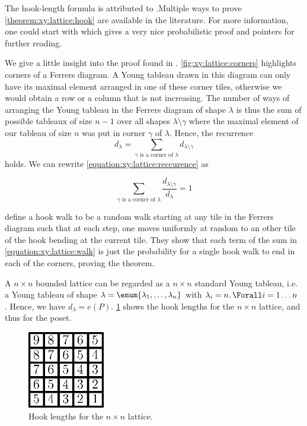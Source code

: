 The hook-length formula is attributed to \citet*{frame:1954}.Multiple ways to
prove \ref{theorem:xy:lattice:hook} are available in the literature. For more
information, one could start with \citet*{greene:1979} which gives a very nice
probabilistic proof and pointers for further reading.

We give a little insight into the proof found in \citet*{greene:1979}.
\ref{fig:xy:lattice:corners} highlights corners of a Ferrers diagram. A Young
tableau drawn in this diagram can only have its maximal element arranged in
one of these corner tiles, otherwise we would obtain a row or a column that is
not increasing. The number of ways of arranging the Young tableau in the
Ferrers diagram of shape \(\lambda\) is thus the sum of possible tableaux of
size \(n-1\) over all shapes \(\lambda \setminus \gamma\) where the maximal
element of our tableau of size \(n\) was put in corner \(\gamma\) of
\(\lambda\). Hence, the recurrence
\begin{equation}\label{equation:xy:lattice:reccurence}
d_{\lambda} = \sum_{\gamma \text{ is a corner of } \lambda} d_{\lambda
\setminus \gamma}
\end{equation}
holds. We can rewrite \ref{equation:xy:lattice:reccurence} as

\begin{equation}\label{equation:xy:lattice:walk}
\sum_{\gamma \text{ is a corner of } \lambda} \frac{d_{\lambda
\setminus \gamma}}{d_{\lambda}} = 1
\end{equation}

\citet*{greene:1979} define a hook walk to be a random walk starting at
any tile in the Ferrers diagram such that at each step, one moves uniformly at
random to an other tile of the hook bending at the current tile.
They show that each term of the sum in \ref{equation:xy:lattice:walk} is just
the probability for a single hook walk to end in each of the corners, proving
the theorem.

A \( n \times n \) bounded lattice can be regarded as a \( n \times n \)
standard Young tableau, i.e. a Young tableau of shape
\( \lambda = \enum{ \lambda_1 , \ldots , \lambda_n } \)
with
\( \lambda_i = n, \Forall i = 1 \ldots n \)
. Hence, we have
\( d_{\lambda} = e(P) \). \ref{fig:xy:lattice:xyhooks} shows the hook lengths
for the \( n \times n \) lattice, and thus for the \XY poset.

\begin{figure}
\centering
\includegraphics[width=0.3\textwidth]{fig/x+y/lattice/xyhooks}
\caption{Hook lengths for the \( n \times n \) lattice.}
\label{fig:xy:lattice:xyhooks}
\end{figure}

